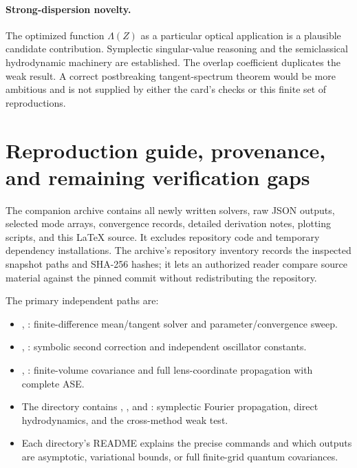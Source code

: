 \documentclass[11pt,a4paper]{article}
\begin{document}
\paragraph{Strong-dispersion novelty.} The optimized function $\Lambda(Z)$ as a particular optical application is a plausible candidate contribution. Symplectic singular-value reasoning and the semiclassical hydrodynamic machinery are established. The overlap coefficient duplicates the weak result. A correct postbreaking tangent-spectrum theorem would be more ambitious and is not supplied by either the card's checks or this finite set of reproductions.

\section{Reproduction guide, provenance, and remaining verification gaps}

The companion archive contains all newly written solvers, raw JSON outputs, selected mode arrays, convergence records, detailed derivation notes, plotting scripts, and this LaTeX source. It excludes repository code and temporary dependency installations. The archive's repository inventory records the inspected snapshot paths and SHA-256 hashes; it lets an authorized reader compare source material against the pinned commit without redistributing the repository.

The primary independent paths are:
\begin{itemize}
\item {}, : finite-difference mean/tangent solver and parameter/convergence sweep.
\item {}, : symbolic second correction and independent oscillator constants.
\item {}, : finite-volume covariance and full lens-coordinate propagation with complete ASE.
\item The  directory contains , , and : symplectic Fourier propagation, direct hydrodynamics, and the cross-method weak test.
\item Each directory's README explains the precise commands and which outputs are asymptotic, variational bounds, or full finite-grid quantum covariances.
\end{itemize}
\end{document}
